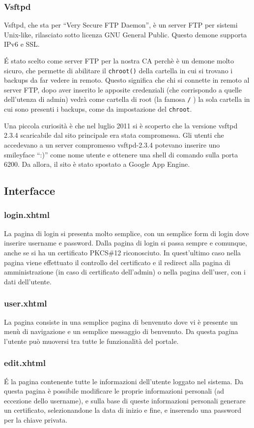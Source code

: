 \documentclass{article}
\begin{document}
\subsubsection*{Vsftpd}
Vsftpd, che sta per ``Very Secure FTP Daemon'', è un server FTP per sistemi Unix-like, rilasciato sotto licenza GNU General Public. Questo demone supporta IPv6 e SSL.

\'E stato scelto come server FTP per la nostra CA perchè è un demone molto sicuro, che permette di abilitare il {\tt chroot()} della cartella in cui si trovano i backups da far vedere in remoto. Questo significa che chi si connette in remoto al server FTP, dopo aver inserito le apposite credenziali (che corrispondo a quelle dell'utenza di admin) vedrà come cartella di root (la famosa {\tt /} ) la sola cartella in cui sono presenti i backups, come da impostazione del {\tt chroot}.

Una piccola curiosità è che nel luglio 2011 si è scoperto che la versione vsftpd 2.3.4 scaricabile dal sito principale era stata compromessa. Gli utenti che accedevano a un server compromesso vsftpd-2.3.4 potevano inserire uno  smileyface ``:)'' come nome utente e ottenere una shell di comando sulla porta 6200. Da allora, il sito è stato spostato a Google App Engine.

\subsection{Interfacce}
\subsubsection*{login.xhtml}
La pagina di login si presenta molto semplice, con un semplice form di login dove inserire username e password. Dalla pagina di login si passa sempre e comunque, anche se si ha un certificato PKCS\#12 riconosciuto. In quest'ultimo caso nella pagina viene effettuato il controllo del certificato e il redirect alla pagina di amministrazione (in caso di certificato dell'admin) o nella pagina dell'user, con i dati dell'utente.
\subsubsection*{user.xhtml}
La pagina consiste in una semplice pagina di benvenuto dove vi è presente un menù di navigazione e un semplice messaggio di benvenuto. Da questa pagina l'utente può muoversi tra tutte le funzionalità del portale.
\subsubsection*{edit.xhtml}
\'E la pagina contenente tutte le informazioni dell'utente loggato nel sistema. Da questa pagina è possibile modificare le proprie informazioni personali (ad eccezione dello username), e sulla base di queste informazioni personali generare un certificato, selezionandone la data di inizio e fine, e inserendo una password per la chiave privata.
\end{document}
